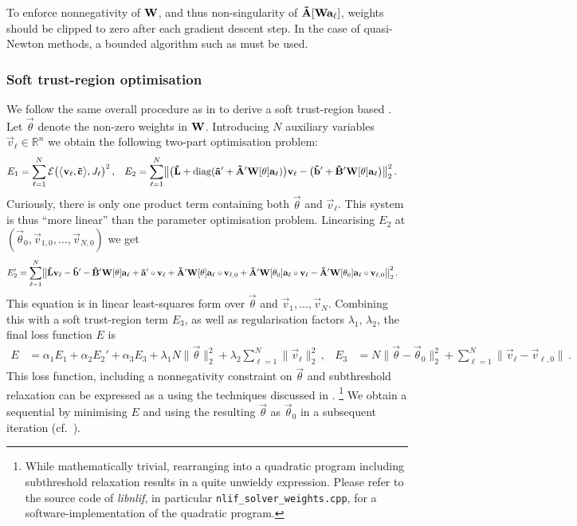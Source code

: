 To enforce nonnegativity of $\mathbf{W}$, and thus non-singularity of $\mathbf{\tilde A}[\mathbf{W} \mathbf{a}_\ell]$, weights should be clipped to zero after each gradient descent step.
In the case of quasi-Newton methods, a bounded algorithm such as \LBFGSB must be used.

\subsubsection{Soft trust-region optimisation}
We follow the same overall procedure as in  to derive a soft trust-region based \SQP.
Let $\vec \theta$ denote the non-zero weights in $\mathbf{W}$.
Introducing $N$ auxiliary variables $\vec v_\ell \in \mathbb{R}^n$ we obtain the following two-part optimisation problem:
\begin{align*}
	E_1 &= \sum_{\ell = 1}^N \mathcal{E}\bigl(
   	   	\bigl\langle
   	   		\mathbf{v}_\ell,
   	   		\mathbf{\tilde c}
   	   	\bigr\rangle, J_\ell \bigr)^2 \,, &
	E_2 &= \sum_{\ell = 1}^N  \bigl\|
		\bigl(\mathbf{\tilde L} + \operatorname{\mathrm{diag}}(\mathbf{\tilde a}' + \mathbf{\tilde A}' \mathbf{W}[\mathbf{\theta}] \mathbf{a}_\ell) \bigr) \mathbf{v}_\ell - \bigl(\mathbf{\tilde b}' + \mathbf{\tilde B}' \mathbf{W}[\mathbf{\theta}] \mathbf{a}_\ell \bigr) \bigr\|_2^2
	\,.
\end{align*}
Curiously, there is only one product term containing both $\vec \theta$ and $\vec v_\ell$.
This system is thus \enquote{more linear} than the parameter optimisation problem.
Linearising $E_2$ at $(\vec \theta_0, \vec v_{1, 0}, \ldots, \vec v_{N, 0})$ we get
\begin{align*}
	E_2' &= \sum_{\ell = 1}^N  \bigl\|
		  \mathbf{\tilde L} \mathbf{v}_\ell
		- \mathbf{\tilde b}'
		- \mathbf{\tilde B}' \mathbf{W}[\mathbf{\theta}] \mathbf{a}_\ell
		+ \mathbf{\tilde a}' \circ \mathbf{v}_\ell
		+ \mathbf{\tilde A}' \mathbf{W}[\mathbf{\theta}] \mathbf{a}_\ell \circ \mathbf{v}_{\ell, 0}
		+ \mathbf{\tilde A}' \mathbf{W}[\mathbf{\theta}_0] \mathbf{a}_\ell \circ \mathbf{v}_\ell
		- \mathbf{\tilde A}' \mathbf{W}[\mathbf{\theta}_0] \mathbf{a}_\ell \circ \mathbf{v}_{\ell, 0}
	\bigr\|_2^2 \,.
\end{align*}
This equation is in linear least-squares form over $\vec \theta$ and $\vec v_1, \ldots, \vec v_N$.
Combining this with a soft trust-region term $E_3$, as well as regularisation factors $\lambda_1$, $\lambda_2$, the final loss function $E$ is
\begin{align}
	E &= \alpha_1 E_1 + \alpha_2 E_2' + \alpha_3 E_3 + \lambda_1 N \|\vec \theta\|_2^2 + \lambda_2 \sum_{\ell = 1}^N \| \vec v_\ell \|_2^2 \,, &
	E_3 &= N \|\vec \theta - \vec \theta_0 \|_2^2 + \sum_{\ell = 1}^N \| \vec v_\ell - \vec v_{\ell, 0} \| \,.
	\label{eqn:nlif_weight_sqp}
\end{align}
This loss function, including a nonnegativity constraint on $\vec \theta$ and subthreshold relaxation can be expressed as a \QP using the techniques discussed in .%
\footnote{While mathematically trivial, rearranging  into a quadratic program including subthreshold relaxation results in a quite unwieldy expression.
Please refer to the source code of \emph{libnlif}, in particular \texttt{nlif\_solver\_weights.cpp}, for a software-implementation of the quadratic program.}
We obtain a sequential \QP by minimising $E$ and using the resulting $\vec \theta$ as $\vec \theta_0$ in a subsequent iteration (cf.~).

